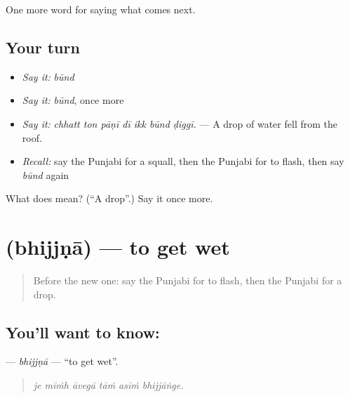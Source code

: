 \begin{grammarlens}[title={What you've built}]
One more word for saying what comes next.
\end{grammarlens}

\subsection*{Your turn}
\begin{itemize}
\raggedright
  \item \emph{Say it:} \emph{būnd}
  \item \emph{Say it:} \emph{būnd}, once more
  \item \emph{Say it:} \emph{chhatt ton pāṇī dī ikk būnd ḍiggī.} — A drop of water fell from the roof.
  \item \emph{Recall:} say the Punjabi for a squall, then the Punjabi for to flash, then say \emph{būnd} again
\end{itemize}

\begin{tcolorbox}[breakable,colback=teal!4,colframe=teal!35!black,title={Before you move on}]
What does  mean? (\textquotedblleft{}A drop\textquotedblright{}.) Say it once more.
\end{tcolorbox}
\section[\texorpdfstring{\pa{ਭਿੱਜਣਾ} (bhijjṇā)}{ਭਿੱਜਣਾ (bhijjṇā)}]{ (bhijjṇā) — to get wet}

\label{lesson:PA-C287-bhijjna}



\begin{quote}
Before the new one: say the Punjabi for to flash, then the Punjabi for a drop.
\end{quote}

\subsection*{You'll want to know: }
\textbf{} — \emph{bhijjṇā} — \textquotedblleft{}to get wet\textquotedblright{}.

\begin{quote}
     
\end{quote}

\begin{quote}
\emph{je mīṁh āvegā tāṁ asīṁ bhijjāṅge.}
\end{quote}


